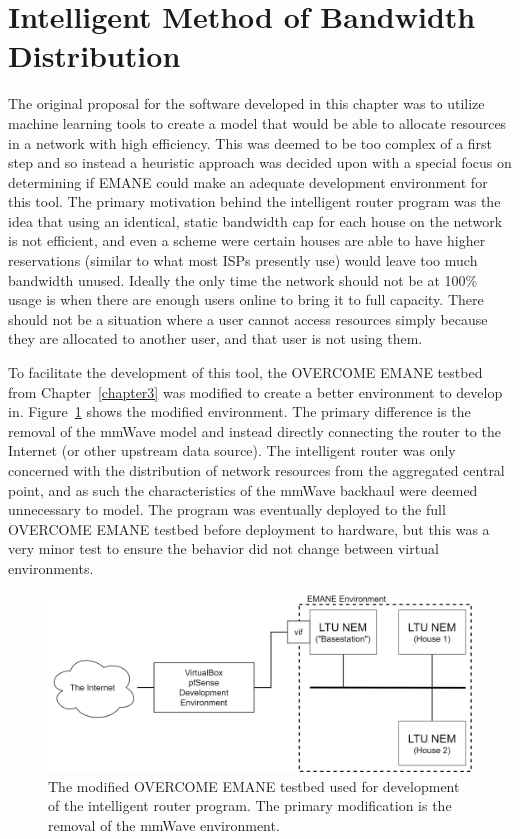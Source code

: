 \section{Intelligent Method of Bandwidth Distribution}
The original proposal for the software developed in this chapter was to utilize machine learning tools to create a model that would be able to allocate resources in a network with high efficiency.
This was deemed to be too complex of a first step and so instead a heuristic approach was decided upon with a special focus on determining if EMANE could make an adequate development environment for this tool.
The primary motivation behind the intelligent router program was the idea that using an identical, static bandwidth cap for each house on the network is not efficient, and even a scheme were certain houses are able to have higher reservations (similar to what most ISPs presently use) would leave too much bandwidth unused.
Ideally the only time the network should not be at 100\% usage is when there are enough users online to bring it to full capacity.
There should not be a situation where a user cannot access resources simply because they are allocated to another user, and that user is not using them.\par
To facilitate the development of this tool, the OVERCOME EMANE testbed from Chapter~\ref{chapter3} was modified to create a better environment to develop in. 
Figure~\ref{pfsense_dev} shows the modified environment.
The primary difference is the removal of the mmWave model and instead directly connecting the router to the Internet (or other upstream data source).
The intelligent router was only concerned with the distribution of network resources from the aggregated central point, and as such the characteristics of the mmWave backhaul were deemed unnecessary to model.
The program was eventually deployed to the full OVERCOME EMANE testbed before deployment to hardware, but this was a very minor test to ensure the behavior did not change between virtual environments.
\begin{figure}[!ht]
    \centering
    \includegraphics[width=\textwidth,keepaspectratio]{Images/Chpt4/pfsense_dev.png}
    \caption{The modified OVERCOME EMANE testbed used for development of the intelligent router program. The primary modification is the removal of the mmWave environment.}
    \label{pfsense_dev}
\end{figure}


